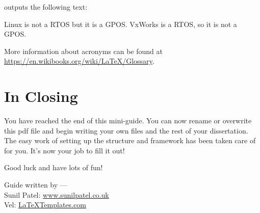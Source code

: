 outputs the following text: 

Linux is not a \gls{RTOS} but it is a \gls{GPOS}. VxWorks is a \gls{RTOS}, so it is not a \gls{GPOS}.

More information about acronyms can be found at 
\url{https://en.wikibooks.org/wiki/LaTeX/Glossary}.


\section{In Closing}

You have reached the end of this mini-guide. You can now rename or overwrite this pdf file and begin writing your own  files and the rest of your dissertation. The easy work of setting up the structure and framework has been taken care of for you. It's now your job to fill it out!

Good luck and have lots of fun!

\begin{flushright}
Guide written by ---\\
Sunil Patel: \href{http://www.sunilpatel.co.uk}{www.sunilpatel.co.uk}\\
Vel: \href{http://www.LaTeXTemplates.com}{LaTeXTemplates.com}
\end{flushright}

